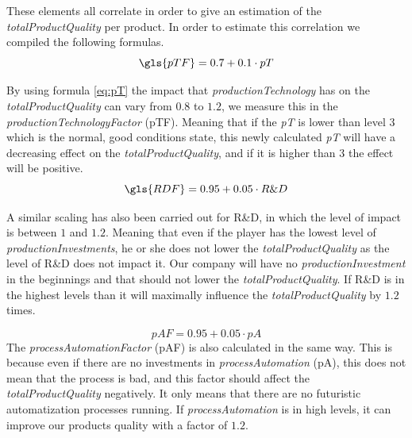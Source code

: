 These elements all correlate in order to give an estimation of the \textit{totalProductQuality} per product. In order to estimate this correlation we compiled the following formulas.
 \begin{equation}
\gls{pTF}=0.7+0.1 \cdot pT
 \label{eq:pT}
 \end{equation}
 
By using formula \ref{eq:pT} the impact that \textit{productionTechnology} has on the \textit{totalProductQuality} can vary from $0.8$ to $1.2$, we measure this in the \textit{productionTechnologyFactor} (\gls{pTF}). Meaning that if the \textit{pT} is lower than level $3$ which is the normal, good conditions state, this newly calculated \textit{pT} will have a decreasing effect on the \textit{totalProductQuality}, and if it is higher than $3$ the effect will be positive.
\begin{equation}
\gls{RDF}= 0.95 + 0.05 \cdot R\&D
\label{eq:R\&D}
\end{equation}

A similar scaling has also been carried out for R\&D, in which the level of impact is between $1$ and $1.2$. Meaning that even if the player has the lowest level of \textit{productionInvestments}, he or she does not lower the \textit{totalProductQuality} as the level of R\&D does not impact it. Our company will have no \textit{productionInvestment} in the beginnings and that should not lower the \textit{totalProductQuality}. If R\&D is in the highest levels than it will maximally influence the \textit{totalProductQuality} by $1.2$ times.

\begin{equation}
pAF= 0.95 + 0.05 \cdot pA
\label{eq:pAF}
\end{equation}
The \textit{processAutomationFactor} (\gls{pAF}) is also calculated in the same way. This is because even if there are no investments in \textit{processAutomation} (pA), this does not mean that the process is bad, and this factor should affect the \textit{totalProductQuality} negatively. It only means that there are no futuristic automatization processes running. If \textit{processAutomation} is in high levels, it can improve our products quality with a factor of $1.2$. 

